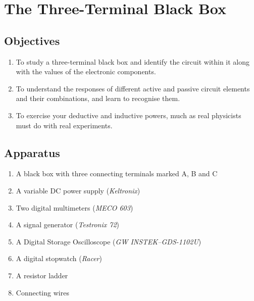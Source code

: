 
\chapter{The Three-Terminal Black Box}

\section*{Objectives}

\begin{enumerate}
\item To study a three-terminal black box and identify the circuit within it along with the values of the electronic components.

\item To understand the responses of different active and passive circuit elements and their combinations, and learn to recognise them.

\item To exercise your deductive and inductive powers, much as real physicists must do with real experiments.

\end{enumerate}




\section*{Apparatus}

\begin{enumerate}
\item A black box with three connecting terminals marked A, B and C
\item A variable DC power supply (\textit{Keltronix})
\item Two digital multimeters (\textit{MECO 603})
\item A signal generator (\textit{Testronix 72})
\item A Digital Storage Oscilloscope (\textit{GW INSTEK–GDS-1102U})
\item A digital stopwatch (\textit{Racer})
\item A resistor ladder
\item Connecting wires

\end{enumerate}



